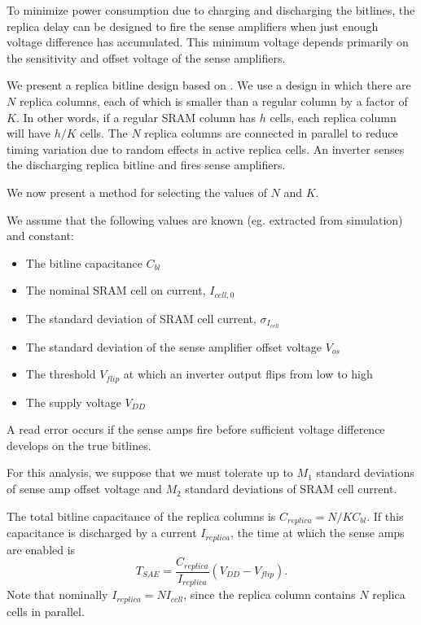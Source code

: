 To minimize power consumption due to charging and discharging the bitlines,
the replica delay can be designed to fire the sense amplifiers when just enough voltage difference
has accumulated. This minimum voltage depends primarily on the sensitivity and offset voltage of the
sense amplifiers.

We present a replica bitline design based on \cite{replicabl}.
We use a design in which there are $N$ replica columns, each of which is smaller than a regular column by a factor of $K$. In other words, if a regular SRAM column has $h$ cells, each replica column will have $h/K$ cells.
The $N$ replica columns are connected in parallel to reduce timing variation due to random effects in active replica cells.
An inverter senses the discharging replica bitline and fires sense amplifiers.

We now present a method for selecting the values of $N$ and $K$.

We assume that the following values are known (eg. extracted from simulation) and constant:
\begin{itemize}
\item The bitline capacitance $C_{bl}$
\item The nominal SRAM cell on current, $I_{cell,0}$
\item The standard deviation of SRAM cell current, $\sigma_{I_{cell}}$
\item The standard deviation of the sense amplifier offset voltage $V_{os}$
\item The threshold $V_{flip}$ at which an inverter output flips from low to high
\item The supply voltage $V_{DD}$
\end{itemize}

A read error occurs if the sense amps fire before sufficient voltage difference develops on the true bitlines.

For this analysis, we suppose that we must tolerate up to $M_1$ standard deviations of sense amp offset voltage
and $M_2$ standard deviations of SRAM cell current.

The total bitline capacitance of the replica columns is $ C_{replica} = N/K C_{bl}. $
If this capacitance is discharged by a current $I_{replica}$, the time at which the sense amps are enabled is
\begin{equation}
T_{SAE} = \frac{C_{replica}}{I_{replica}}\left( V_{DD} - V_{flip} \right).
\end{equation}
Note that nominally $I_{replica} = N I_{cell}$, since the replica column contains $N$ replica cells in parallel.

